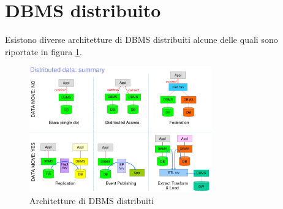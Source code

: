 \section{DBMS distribuito}
Esistono diverse architetture di DBMS distribuiti alcune delle quali sono
riportate in figura \ref{fig:DBMS_distributed_architecture}.
\begin{figure}
    \centering
    \includegraphics[width=0.7\textwidth]{./img/DBMS/DBMS_distributed_architecture.png}
    \caption{Architetture di DBMS distribuiti}
    \label{fig:DBMS_distributed_architecture}
\end{figure}
